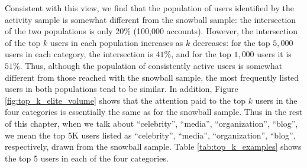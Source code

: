 \documentclass[phd,tocprelim]{cornell}
\begin{document}
Consistent with this view, we find that the population of users identified
by the activity sample is somewhat different from the snowball sample: the
intersection of the two populations is only 20$\%$ (100,000
accounts). However, the intersection of the top $k$ users in each
population increases as $k$ decreases: for the top $5,000$ users in each
category, the intersection is $41\%$, and for the top $1,000$ users it is
$51\%$. Thus, although the population of consistently active users is
somewhat different from those reached with the snowball sample, the most
frequently listed users in both populations tend to be similar. In
addition, Figure \ref{fig:top_k_elite_volume} shows that the attention paid
to the top $k$ users in the four categories is essentially the same as for
the snowball sample.  Thus in the rest of this chapter, when we talk about
``celebrity'', ``media'', ``organization'', ``blog'', we mean the top 5K
users listed as ``celebrity'', ``media'', ``organization'', ``blog'',
respectively, drawn from the snowball sample. Table
\ref{tab:top_k_examples} shows the top 5 users in each of
the four categories.


\end{document}
